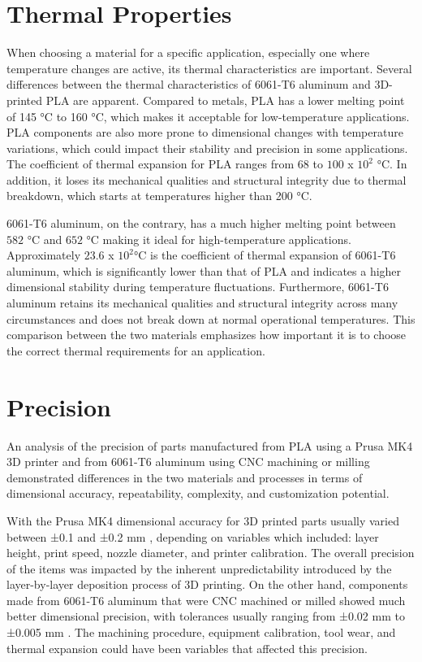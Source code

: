 \section{Thermal Properties}

    When choosing a material for a specific application, especially one where temperature changes are
    active, its thermal characteristics are important. Several differences between the thermal
    characteristics of 6061-T6 aluminum and 3D-printed PLA are apparent. Compared to metals, PLA has a
    lower melting point of 145 °C to 160 °C, which makes it acceptable for low-temperature applications. PLA
    components are also more prone to dimensional changes with temperature variations, which could
    impact their stability and precision in some applications. The coefficient of thermal expansion \cite{pla_spec_ultimaker} for PLA
    ranges from 68 to \(100\) x \(10^2\) °C. In addition, it loses its mechanical qualities and structural integrity due
    to thermal breakdown, which starts at temperatures higher than 200 °C.

    6061-T6 aluminum, on the contrary, has a much higher melting point between \(582\) °C and \(652\) °C making it ideal for high-temperature applications. Approximately \(23.6\) x \(10^2\)°C is the coefficient of
    thermal expansion of 6061-T6 aluminum, which is significantly lower than that of PLA and indicates a higher dimensional stability during temperature fluctuations. Furthermore, 6061-T6 aluminum retains its
    mechanical qualities and structural integrity across many circumstances and does not break down at
    normal operational temperatures. This comparison between the two materials emphasizes how important it is to choose the correct thermal requirements for an application. \cite{aluminum_spec}

\section{Precision}

    An analysis of the precision of parts manufactured from PLA using a Prusa MK4 3D printer and from
    6061-T6 aluminum using CNC machining or milling demonstrated differences in the two materials and
    processes in terms of dimensional accuracy, repeatability, complexity, and customization potential.

    With the Prusa MK4 dimensional accuracy for 3D printed parts usually varied between ±0.1 and ±0.2 mm \cite{prusa_mk4_precision},
    depending on variables which included: layer height, print speed, nozzle diameter, and printer calibration.
    The overall precision of the items was impacted by the inherent unpredictability introduced by the layer-by-layer deposition process of 3D printing. On the other hand, components made from 6061-T6 aluminum
    that were CNC machined or milled showed much better dimensional precision, with tolerances usually
    ranging from ±0.02 mm to ±0.005 mm \cite{cnc_milling_precision}. The machining procedure, equipment calibration, tool wear, and
    thermal expansion could have been variables that affected this precision.

